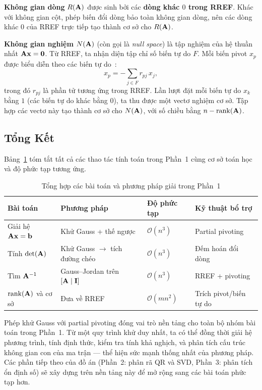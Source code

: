 \textbf{Không gian dòng} $R(\mathbf{A})$ được sinh bởi các \textbf{dòng khác $0$ trong RREF}. Khác với không gian cột, phép biến đổi dòng bảo toàn không gian dòng, nên các dòng khác $0$ của RREF trực tiếp tạo thành cơ sở cho $R(\mathbf{A})$.

\textbf{Không gian nghiệm} $N(\mathbf{A})$ (còn gọi là \textit{null space}) là tập nghiệm của hệ thuần nhất $\mathbf{A}\mathbf{x} = \mathbf{0}$. Từ RREF, ta nhận diện tập chỉ số biến tự do $F$. Mỗi biến pivot $x_p$ được biểu diễn theo các biến tự do~\cite{strang2023}:
\begin{equation}
    x_p = -\sum_{j \in F} r_{pj}\,x_j,
\end{equation}
trong đó $r_{pj}$ là phần tử tương ứng trong RREF. Lần lượt đặt mỗi biến tự do $x_k$ bằng $1$ (các biến tự do khác bằng $0$), ta thu được một vectơ nghiệm cơ sở. Tập hợp các vectơ này tạo thành cơ sở cho $N(\mathbf{A})$, với số chiều bằng $n - \operatorname{rank}(\mathbf{A})$.

\subsection{Tổng Kết}

Bảng~\ref{tab:part1_summary} tóm tắt tất cả các thao tác tính toán trong Phần~1 cùng cơ sở toán học và độ phức tạp tương ứng.

\begin{table}[H]
\centering
\caption{Tổng hợp các bài toán và phương pháp giải trong Phần~1}
\label{tab:part1_summary}
\renewcommand{\arraystretch}{1.5}
\setlength{\tabcolsep}{8pt}
\begin{tabular}{p{3.5cm}p{4.5cm}p{2.5cm}p{3cm}}
\toprule
\textbf{Bài toán} & \textbf{Phương pháp} & \textbf{Độ phức tạp} & \textbf{Kỹ thuật bổ trợ} \\
\midrule
Giải hệ $\mathbf{A}\mathbf{x}=\mathbf{b}$ & Khử Gauss + thế ngược & $\mathcal{O}(n^3)$ & Partial pivoting \\
Tính $\det(\mathbf{A})$ & Khử Gauss $\to$ tích đường chéo & $\mathcal{O}(n^3)$ & Đếm hoán đổi dòng \\
Tìm $\mathbf{A}^{-1}$ & Gauss--Jordan trên $[\mathbf{A}\mid\mathbf{I}]$ & $\mathcal{O}(n^3)$ & RREF + pivoting \\
$\operatorname{rank}(\mathbf{A})$ và cơ sở & Đưa về RREF & $\mathcal{O}(mn^2)$ & Trích pivot/biến tự do \\
\bottomrule
\end{tabular}
\end{table}

Phép khử Gauss với partial pivoting đóng vai trò nền tảng cho toàn bộ nhóm bài toán trong Phần~1. Từ một quy trình khử duy nhất, ta có thể đồng thời giải hệ phương trình, tính định thức, kiểm tra tính khả nghịch, và phân tích cấu trúc không gian con của ma trận --- thể hiện sức mạnh thống nhất của phương pháp. Các phần tiếp theo của đồ án (Phần~2: phân rã QR và SVD, Phần~3: phân tích ổn định số) sẽ xây dựng trên nền tảng này để mở rộng sang các bài toán phức tạp hơn.
